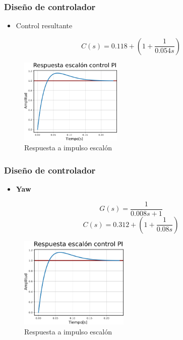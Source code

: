 \documentclass[11pt]{beamer}
\begin{document}
  \begin{frame}
    \frametitle{Diseño de controlador}
    \begin{itemize}
      \item Control resultante
    \end{itemize}
    \begin{equation}
      C(s) = 0.118 + (1 + \frac{1}{0.054s})
    \end{equation}
    \begin{figure}
      \includegraphics[height=4.1cm, keepaspectratio]{images/escalon-pitch.png}
      \caption{Respuesta a impulso escalón}
    \end{figure}
  \end{frame}
  \begin{frame}
    \frametitle{Diseño de controlador}
    \begin{multicols}{2}
      \begin{itemize}
        \item \textbf{Yaw}
      \end{itemize}
      \begin{equation} \nonumber
        G(s) = \frac{1}{0.008s + 1}
      \end{equation}
      \begin{equation}\nonumber
        C(s) = 0.312 + (1 + \frac{1}{0.08s})
      \end{equation}
      \begin{figure}
        \includegraphics[width = 5.2cm, keepaspectratio]{images/escalon-yaw.png}
        \caption{Respuesta a impulso escalón}
      \end{figure}          
    \end{multicols}
  \end{frame}
\end{document}
